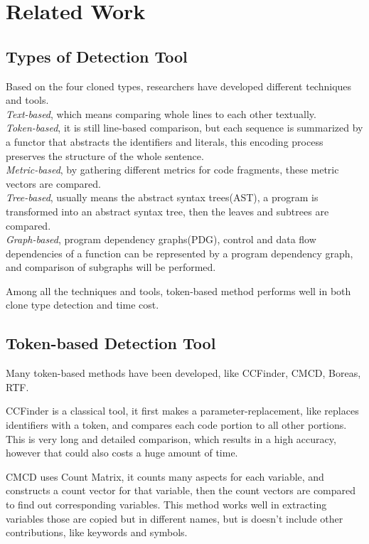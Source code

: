 \documentclass[../main.tex]{subfiles}
\begin{document}
\section{Related Work}

\subsection{Types of Detection Tool}

Based on the four cloned types, researchers have developed different techniques and tools. 
\\ \indent \emph{Text-based}, which means comparing whole lines to each other textually. 
\\ \indent \emph{Token-based}, it is still line-based comparison, but each sequence is summarized by a functor that abstracts the identifiers and literals, this encoding process preserves the structure of the whole sentence.
\\ \indent \emph{Metric-based}, by gathering different metrics for code fragments, these metric vectors are compared.
\\ \indent \emph{Tree-based}, usually means the abstract syntax trees(AST), a program is transformed into an abstract syntax tree, then the leaves and subtrees are compared.
\\ \indent \emph{Graph-based}, program dependency graphs(PDG), control and data flow dependencies of a function can be represented by a program dependency graph, and comparison of subgraphs will be performed.

Among all the techniques and tools, token-based method performs well in both clone type detection and time cost.

\subsection{Token-based Detection Tool}

Many token-based methods have been developed, like CCFinder\cite{CCFinder}, CMCD\cite{CMCD},  Boreas\cite{Boreas}, RTF\cite{RTF}. 

CCFinder is a classical tool, it first makes a parameter-replacement, like replaces identifiers with a token, and compares each code portion to all other portions. This is very long and detailed comparison, which results in a high accuracy, however that could also costs a huge amount of time.

CMCD uses Count Matrix, it counts many aspects for each variable, and constructs a count vector for that variable, then the count vectors are compared to find out corresponding variables. This method works well in extracting variables those are copied but in different names, but is doesn't include other contributions, like keywords and symbols.
\end{document}
